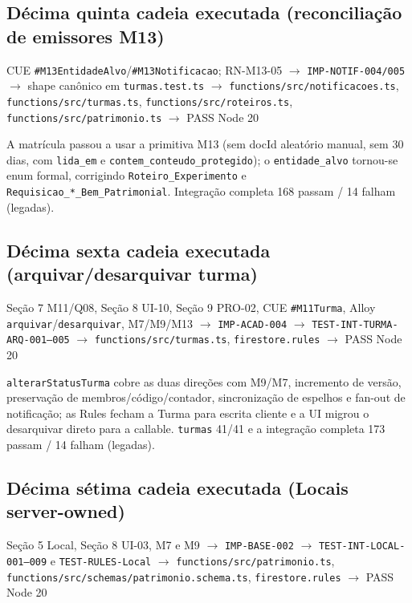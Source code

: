 \subsection{Décima quinta cadeia executada (reconciliação de emissores M13)}

\begin{center}
CUE \texttt{\#M13EntidadeAlvo}/\texttt{\#M13Notificacao}; RN-M13-05
$\rightarrow$ \texttt{IMP-NOTIF-004/005}
$\rightarrow$ shape canônico em \texttt{turmas.test.ts}
$\rightarrow$ \nolinkurl{functions/src/notificacoes.ts}, \nolinkurl{functions/src/turmas.ts}, \nolinkurl{functions/src/roteiros.ts}, \nolinkurl{functions/src/patrimonio.ts}
$\rightarrow$ PASS Node 20
\end{center}

A matrícula passou a usar a primitiva M13 (sem docId aleatório manual, sem 30
dias, com \texttt{lida\_em} e \texttt{contem\_conteudo\_protegido}); o
\texttt{entidade\_alvo} tornou-se enum formal, corrigindo
\texttt{Roteiro\_Experimento} e \texttt{Requisicao\_*\_Bem\_Patrimonial}.
Integração completa 168 passam / 14 falham (legadas).

\subsection{Décima sexta cadeia executada (arquivar/desarquivar turma)}

\begin{center}
Seção 7 M11/Q08, Seção 8 UI-10, Seção 9 PRO-02, CUE \texttt{\#M11Turma}, Alloy \texttt{arquivar}/\texttt{desarquivar}, M7/M9/M13
$\rightarrow$ \texttt{IMP-ACAD-004}
$\rightarrow$ \texttt{TEST-INT-TURMA-ARQ-001--005}
$\rightarrow$ \nolinkurl{functions/src/turmas.ts}, \nolinkurl{firestore.rules}
$\rightarrow$ PASS Node 20
\end{center}

\texttt{alterarStatusTurma} cobre as duas direções com M9/M7, incremento de
versão, preservação de membros/código/contador, sincronização de espelhos e
fan-out de notificação; as Rules fecham a Turma para escrita cliente e a UI
migrou o desarquivar direto para a callable. \texttt{turmas} 41/41 e a
integração completa 173 passam / 14 falham (legadas).

\subsection{Décima sétima cadeia executada (Locais server-owned)}

\begin{center}
Seção 5 Local, Seção 8 UI-03, M7 e M9
$\rightarrow$ \texttt{IMP-BASE-002}
$\rightarrow$ \texttt{TEST-INT-LOCAL-001--009} e \texttt{TEST-RULES-Local}
$\rightarrow$ \nolinkurl{functions/src/patrimonio.ts}, \nolinkurl{functions/src/schemas/patrimonio.schema.ts}, \nolinkurl{firestore.rules}
$\rightarrow$ PASS Node 20
\end{center}

